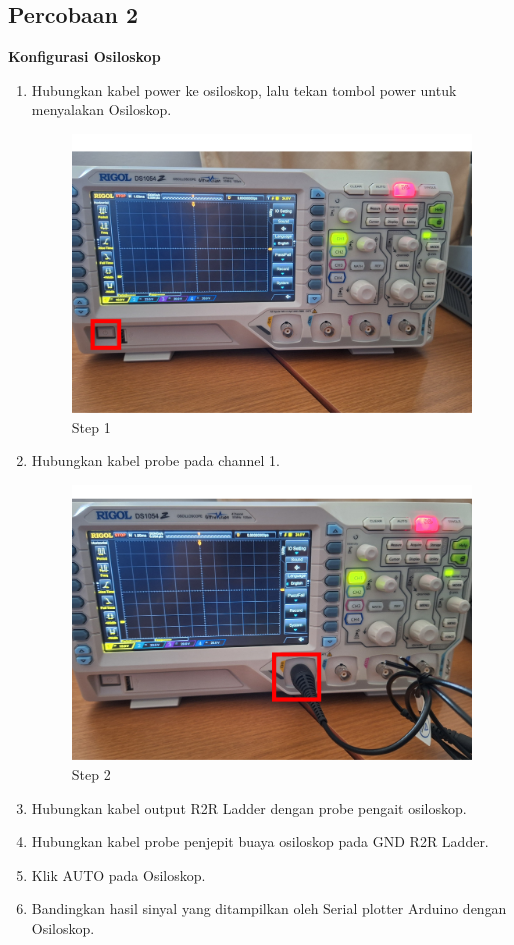 \subsection{Percobaan 2}
\begin{center}
	\textbf{Konfigurasi Osiloskop}
	\begin{enumerate}
		\item Hubungkan kabel power ke osiloskop, lalu tekan tombol power untuk menyalakan Osiloskop. 
		\begin{figure}[H]
			\centering
			\includegraphics[width=0.8\linewidth]{P3/img/step 7.png}
			\caption{Step 1}
			\label{fig:Step 1(Step 1)}
		\end{figure}
		\item Hubungkan kabel probe pada channel 1. 
		\begin{figure}[H]
			\centering
			\includegraphics[width=0.8\linewidth]{P3/img/step 8.png}
			\caption{Step 2}
			\label{fig:Step 2(Step 2)}
		\end{figure}
		\item Hubungkan kabel output R2R Ladder dengan probe pengait osiloskop.
		\item Hubungkan kabel probe penjepit buaya osiloskop pada GND R2R Ladder.
		\item Klik AUTO pada Osiloskop.
		\item Bandingkan hasil sinyal yang ditampilkan oleh Serial plotter Arduino dengan Osiloskop.
	\end{enumerate}	
\end{center}

